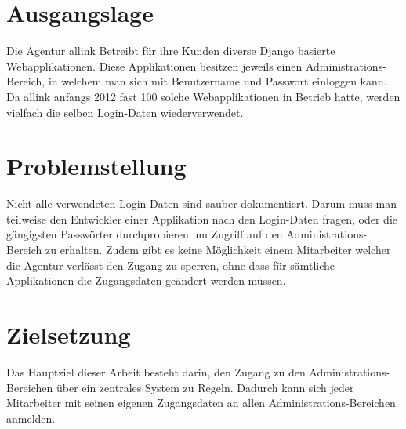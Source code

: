 \section{Ausgangslage}
\label{sec:EinleitungAusgangslage}
Die Agentur allink Betreibt für ihre Kunden diverse Django basierte Webapplikationen. Diese Applikationen besitzen jeweils einen Administrations-Bereich, in welchem man sich mit Benutzername und Passwort einloggen kann. Da allink anfangs 2012 fast 100 solche Webapplikationen in Betrieb hatte, werden vielfach die selben Login-Daten wiederverwendet.

\section{Problemstellung}
\label{sec:Problemstellung}
Nicht alle verwendeten Login-Daten sind sauber dokumentiert. Darum muss man teilweise den Entwickler einer Applikation nach den Login-Daten fragen, oder die gängigsten Passwörter durchprobieren um Zugriff auf den Administrations-Bereich zu erhalten. Zudem gibt es keine Möglichkeit einem Mitarbeiter welcher die Agentur verlässt den Zugang zu sperren, ohne dass für sämtliche Applikationen die Zugangsdaten geändert werden müssen.

\section{Zielsetzung}
\label{sec:Zielsetzung}
Das Hauptziel dieser Arbeit besteht darin, den Zugang zu den Administrations-Bereichen über ein zentrales System zu Regeln. Dadurch kann sich jeder Mitarbeiter mit seinen eigenen Zugangsdaten an allen Administrations-Bereichen anmelden.
